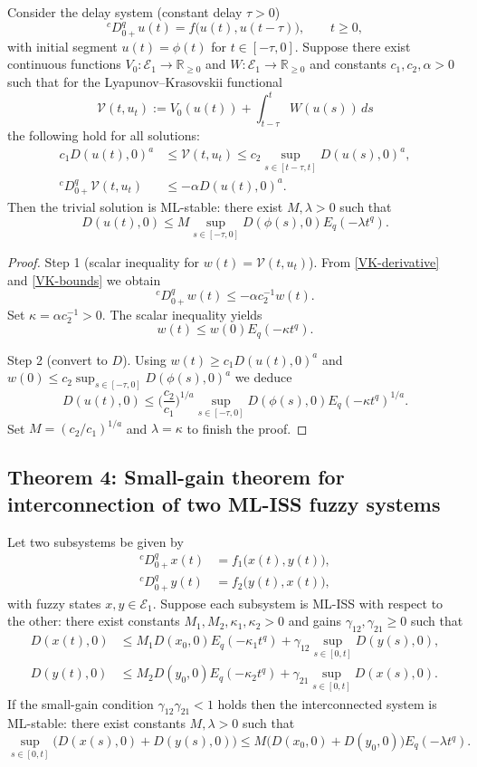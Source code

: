 \documentclass[11pt,a4paper]{article}
\theoremstyle{plain}
\theoremstyle{definition}
\theoremstyle{remark}
\newcommand{\E}{\mathcal{E}_1}
\newcommand{\Haus}{D}
\begin{document}
	Consider the delay system (constant delay \(\tau>0\))
	\[
	{}^cD_{0+}^q u(t)=f\big(u(t),u(t-\tau)\big),\qquad t\ge0,
	\]
	with initial segment \(u(t)=\phi(t)\) for \(t\in[-\tau,0]\). Suppose there exist continuous functions \(V_0:\E\to\mathbb{R}_{\ge0}\) and \(W:\E\to\mathbb{R}_{\ge0}\) and constants \(c_1,c_2,\alpha>0\) such that for the Lyapunov–Krasovskii functional
	\[
	\mathcal{V}(t,u_t):=V_0(u(t))+\int_{t-\tau}^t W(u(s))\,ds
	\]
	the following hold for all solutions:
	\begin{align}
		c_1\Haus(u(t),0)^a &\le \mathcal V(t,u_t) \le c_2\sup_{s\in[t-\tau,t]}\Haus(u(s),0)^a,\label{VK-bounds}\\
		{}^cD_{0+}^q \mathcal V(t,u_t) &\le -\alpha\Haus(u(t),0)^a.\label{VK-derivative}
	\end{align}
	Then the trivial solution is ML-stable: there exist \(M,\lambda>0\) such that
	\[
	\Haus(u(t),0)\le M\sup_{s\in[-\tau,0]}\Haus(\phi(s),0) E_q(-\lambda t^q).
	\]
	
	\begin{proof}
		Step 1 (scalar inequality for \(w(t)=\mathcal V(t,u_t)\)). From \eqref{VK-derivative} and \eqref{VK-bounds} we obtain
		\[
		{}^cD_{0+}^q w(t) \le -\alpha c_2^{-1} w(t).
		\]
		Set \(\kappa=\alpha c_2^{-1}>0\). The scalar inequality yields
		\[
		w(t)\le w(0)E_q(-\kappa t^q).
		\]
		
		Step 2 (convert to \(\Haus\)). Using \(w(t)\ge c_1\Haus(u(t),0)^a\) and \(w(0)\le c_2\sup_{s\in[-\tau,0]}\Haus(\phi(s),0)^a\) we deduce
		\[
		\Haus(u(t),0)\le \Big(\frac{c_2}{c_1}\Big)^{1/a}\sup_{s\in[-\tau,0]}\Haus(\phi(s),0) E_q(-\kappa t^q)^{1/a}.
		\]
		Set \(M=(c_2/c_1)^{1/a}\) and \(\lambda=\kappa\) to finish the proof.
	\end{proof}
	
	\subsection{Theorem 4: Small-gain theorem for interconnection of two ML-ISS fuzzy systems}
	
	Let two subsystems be given by
	\begin{align*}
		{}^cD_{0+}^q x(t) &= f_1\big(x(t),y(t)\big),\\
		{}^cD_{0+}^q y(t) &= f_2\big(y(t),x(t)\big),
	\end{align*}
	with fuzzy states \(x,y\in\E\). Suppose each subsystem is ML-ISS with respect to the other: there exist constants \(M_1,M_2,\kappa_1,\kappa_2>0\) and gains \(\gamma_{12},\gamma_{21}\ge0\) such that
	\begin{align*}
		\Haus(x(t),0) &\le M_1\Haus(x_0,0)E_q(-\kappa_1 t^q)+\gamma_{12}\sup_{s\in[0,t]}\Haus(y(s),0),\\
		\Haus(y(t),0) &\le M_2\Haus(y_0,0)E_q(-\kappa_2 t^q)+\gamma_{21}\sup_{s\in[0,t]}\Haus(x(s),0).
	\end{align*}
	If the small-gain condition \(\gamma_{12}\gamma_{21}<1\) holds then the interconnected system is ML-stable: there exist constants \(M,\lambda>0\) such that
	\[
	\sup_{s\in[0,t]}\big(\Haus(x(s),0)+\Haus(y(s),0)\big) \le M\big(\Haus(x_0,0)+\Haus(y_0,0)\big)E_q(-\lambda t^q).
	\]
	
\end{document}
